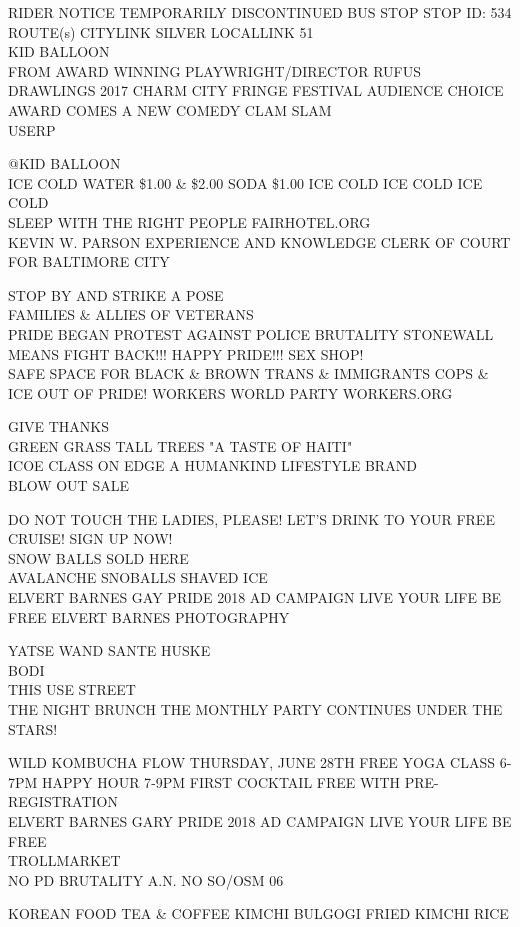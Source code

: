 \documentclass[10pt,letterpaper]{article}
\begin{document}
RIDER NOTICE TEMPORARILY DISCONTINUED BUS STOP STOP ID: 534 ROUTE(s) CITYLINK SILVER LOCALLINK 51\\
KID BALLOON\\
FROM AWARD WINNING PLAYWRIGHT/DIRECTOR RUFUS DRAWLINGS 2017 CHARM CITY FRINGE FESTIVAL AUDIENCE CHOICE AWARD COMES A NEW COMEDY CLAM SLAM\\
USERP

@KID BALLOON\\
ICE COLD WATER \$1.00 \& \$2.00 SODA \$1.00 ICE COLD ICE COLD ICE COLD\\
SLEEP WITH THE RIGHT PEOPLE FAIRHOTEL.ORG\\
KEVIN W. PARSON EXPERIENCE AND KNOWLEDGE CLERK OF COURT FOR BALTIMORE CITY

STOP BY AND STRIKE A POSE\\
FAMILIES \& ALLIES OF VETERANS\\
PRIDE BEGAN PROTEST AGAINST POLICE BRUTALITY STONEWALL MEANS FIGHT BACK!!! HAPPY PRIDE!!! SEX SHOP!\\
SAFE SPACE FOR BLACK \& BROWN TRANS \& IMMIGRANTS COPS \& ICE OUT OF PRIDE!  WORKERS WORLD PARTY WORKERS.ORG

GIVE THANKS\\
GREEN GRASS TALL TREES "A TASTE OF HAITI"\\
ICOE CLASS ON EDGE A HUMANKIND LIFESTYLE BRAND\\
BLOW OUT SALE

DO NOT TOUCH THE LADIES, PLEASE!  LET'S DRINK TO YOUR FREE CRUISE!  SIGN UP NOW!\\
SNOW BALLS SOLD HERE\\
AVALANCHE SNOBALLS SHAVED ICE\\
ELVERT BARNES GAY PRIDE 2018 AD CAMPAIGN LIVE YOUR LIFE BE FREE ELVERT BARNES PHOTOGRAPHY

YATSE WAND SANTE HUSKE\\
BODI\\
THIS USE STREET\\
THE NIGHT BRUNCH THE MONTHLY PARTY CONTINUES UNDER THE STARS!

WILD KOMBUCHA FLOW THURSDAY, JUNE 28TH FREE YOGA CLASS 6{-}7PM HAPPY HOUR 7{-}9PM FIRST COCKTAIL FREE WITH PRE{-}REGISTRATION\\
ELVERT BARNES GARY PRIDE 2018 AD CAMPAIGN LIVE YOUR LIFE BE FREE\\
TROLLMARKET\\
NO PD BRUTALITY A.N. NO SO/OSM 06

KOREAN FOOD TEA \& COFFEE KIMCHI BULGOGI FRIED KIMCHI RICE
\
\end{document}

